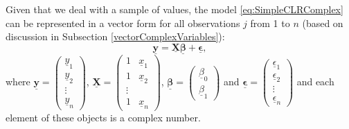 \documentclass[
]{book}
\begin{document}
Given that we deal with a sample of values, the model \eqref{eq:SimpleCLRComplex} can be represented in a vector form for all observations \(j\) from 1 to \(n\) (based on discussion in Subsection \ref{vectorComplexVariables}):
\begin{equation}
    \underline{\mathbf{y}} = \underline{\mathbf{X}} \underline{\boldsymbol{\beta}} + \underline{\boldsymbol{\epsilon}} ,
    \label{eq:SimpleCLRVector}
\end{equation}
where \(\underline{\mathbf{y}}=\begin{pmatrix} \underline{y}_1 \\ \underline{y}_2 \\ \vdots \\ \underline{y}_n \end{pmatrix}\), \(\underline{\mathbf{X}} = \begin{pmatrix} 1 & \underline{x}_1 \\ 1 & \underline{x}_2 \\ \vdots \\ 1 & \underline{x}_n \end{pmatrix}\), \(\underline{\boldsymbol{\beta}} = \begin{pmatrix} \underline{\beta}_0 \\ \underline{\beta}_1 \end{pmatrix}\) and \(\underline{\boldsymbol{\epsilon}} = \begin{pmatrix} \underline{\epsilon}_1 \\ \underline{\epsilon}_2 \\ \vdots \\ \underline{\epsilon}_n \end{pmatrix}\) and each element of these objects is a complex number.
\end{document}
